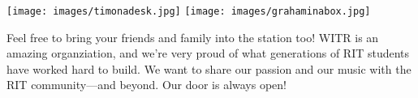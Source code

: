 \documentclass{witrman}
\begin{document}
\texttt{[image: images/timonadesk.jpg]}
\texttt{[image: images/grahaminabox.jpg]}

Feel free to bring your friends and family into the station too!  WITR is an
amazing organziation, and we're very proud of what generations of RIT students
have worked hard to build.  We want to share our passion and our music with the
RIT community---and beyond.  Our door is always open!

\makefooter{}
\end{document}
